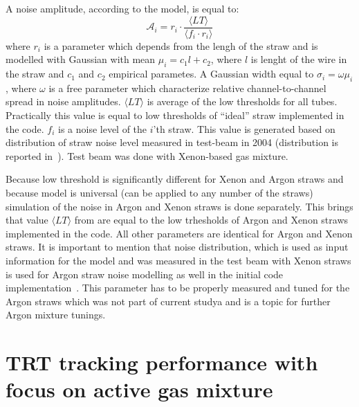 
A noise amplitude, according to the model, is equal to:
\begin{equation}
 \mathcal A_{i} = r_{i} \cdot \dfrac{\langle LT \rangle}{\langle f_i \cdot r_i \rangle}
 \label{eq:ampl_noise}
\end{equation}
where $r_{i}$ is a parameter which depends from the lengh of the straw and is modelled with Gaussian with mean $\mu_i = c_1 l + c_2$, 
where $l$ is lenght of the wire in the straw and $c_1$ and $c_2$ empirical parametes. 
A Gaussian width equal to $\sigma_i = \omega \mu_i$, where $\omega$ is a free parameter which characterize
relative channel-to-channel spread in noise amplitudes.
$\langle LT \rangle$ is average of the low thresholds for all tubes. Practically this value is equal to low thresholds of ``ideal'' straw 
implemented in the code.
$f_{i}$ is a noise level of the $i$'th straw. This value is generated based on distribution of straw noise level measured in test-beam in 2004 
(distribution is reported in~\cite{kittelmann_thesis}). Test beam was done with Xenon-based gas mixture. 

Because low threshold is significantly different for Xenon and Argon straws and because model is universal (can be applied to any number of the straws) 
simulation of the noise in Argon and Xenon straws is done separately. This brings that value $\langle LT \rangle$ from  are 
equal to the low trhesholds of Argon and Xenon straws implemented in the code. All other parameters are identical for Argon and Xenon straws.
It is important to mention that noise distribution, which is used as input information for the model and was measured in the test beam with Xenon straws
is used for Argon straw noise modelling as well in the initial code implementation~\cite{anatoli_private_communication}. 
This parameter has to be properly measured and tuned for the Argon straws which
was not part of current studya and is a topic for further Argon mixture tunings.

\section{TRT tracking performance with focus on active gas mixture}
\label{sec:digi_argon}

